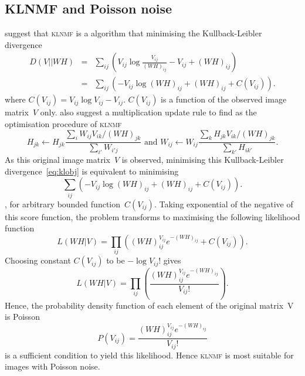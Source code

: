 \subsection{KLNMF and Poisson noise}
\citet{lee2001algorithms} suggest that \textsc{klnmf} is a algorithm that minimising the Kullback-Leibler divergence
\begin{eqnarray}
  D(V||WH)&=&\sum_{ij}\left(V_{ij}\log\frac{V_{ij}}{\left(WH\right)_{ij}}-V_{ij}+\left(WH\right)_{ij}\right)\nonumber\\
          &=&\sum_{ij}\left(-V_{ij}\log\left(WH\right)_{ij}+\left(WH\right)_{ij}+C(V_{ij})\right).\label{eq:klobj}
\end{eqnarray}
where $C(V_{ij})=V_{ij}\log V_{ij}-V_{ij}$. $C(V_{ij})$ is a function of the observed image matrix~$V$ only.
\citet{lee2001algorithms} also suggest a multiplication update rule to find as the optimisation procedure of \textsc{klnmf}
\begin{equation*}
H_{jk}\leftarrow H_{jk}\frac{\sum_{i}W_{ij}V_{ik}/(WH)_{jk}}{\sum_{i'}W_{i'j}} \text{ and } W_{ij}\leftarrow W_{ij}\frac{\sum_{k}H_{jk}V_{ik}/(WH)_{jk}}{\sum_{k'}H_{ik'}}.
\end{equation*}
As this original image matrix~$V$ is observed, minimising this Kullback-Leibler divergence~\eqref{eq:klobj} is equivalent to minimising
\begin{equation*}
  \sum_{ij}\left(-V_{ij}\log\left(WH\right)_{ij}+\left(WH\right)_{ij}+C(V_{ij})\right).
\end{equation*},
for arbitrary bounded function~$C(V_{ij})$. Taking exponential of the negative of this score function, the problem transforms to maximising the following likelihood function
\begin{equation*}
L(WH|V)=\prod_{ij}\left(\left(WH\right)_{ij}^{V_{ij}}e^{-\left(WH\right)_{ij}}+C(V_{ij})\right).
\end{equation*}
Choosing constant $C(V_{ij})$ to be $-\log V_{ij}!$ gives
\begin{equation*}
L(WH|V)=\prod_{ij}\left(\frac{\left(WH\right)_{ij}^{V_{ij}}e^{-\left(WH\right)_{ij}}}{V_{ij}!}\right).
\end{equation*}
Hence, the probability density function of each element of the original matrix~V is Poisson
\begin{equation*}
P(V_{ij})=\frac{\left(WH\right)_{ij}^{V_{ij}}e^{-\left(WH\right)_{ij}}}{V_{ij}!}
\end{equation*}
is a sufficient condition to yield this likelihood. Hence \textsc{klnmf} is most suitable for images with Poisson noise.
